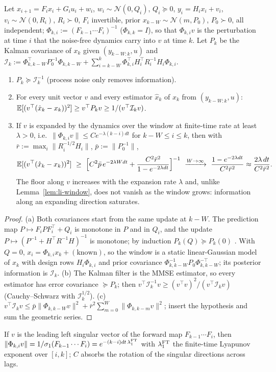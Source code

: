 \begin{lemma}\label{lem:li-expansion}
Let $x_{i+1}=F_ix_i+G_iu_i+w_i$, $w_i\sim\mathcal N(0,Q_i)$, $Q_i\succeq0$, $y_i=H_ix_i+v_i$, $v_i\sim\mathcal N(0,R_i)$,
$R_i\succ0$, $F_i$ invertible, prior $x_{k-W}\sim\mathcal N(m,P_0)$, $P_0\succ0$, all independent; $\Phi_{k,i}:=(F_{k-1}\cdots F_i)^{-1}$
($\Phi_{k,k}=I$), so that $\Phi_{k,i}v$ is the perturbation at time $i$ that the noise-free dynamics carry into $v$ at
time $k$. Let $P_k$ be the Kalman covariance of $x_k$ given $(y_{k-W:k},u)$ and
$\mathcal I_k:=\Phi_{k,k-W}^\top P_0^{-1}\Phi_{k,k-W}+\sum_{i=k-W}^{k}\Phi_{k,i}^\top H_i^\top R_i^{-1}H_i\Phi_{k,i}$.
\begin{enumerate}[leftmargin=2.2em]
\item[(a)] $P_k\succeq\mathcal I_k^{-1}$ (process noise only removes information).
\item[(b)] For every unit vector $v$ and every estimator $\hat x_k$ of $x_k$ from $(y_{k-W:k},u)$:
$\mathbb E[(v^\top(\hat x_k-x_k))^2]\ge v^\top P_kv\ge1/(v^\top\mathcal I_kv)$.
\item[(c)] If $v$ is expanded by the dynamics over the window at finite-time rate at least $\lambda>0$, i.e.\
$\|\Phi_{k,i}v\|\le C e^{-\lambda(k-i)dt}$ for $k-W\le i\le k$, then with $\bar r:=\max_i\|R_i^{-1/2}H_i\|$, $\bar p:=\|P_0^{-1}\|$,
\[
\E[(v^\top(\hat x_k-x_k))^2]\ \ge\ \Big[C^2\bar p\,e^{-2\lambda Wdt}+\frac{C^2\bar r^2}{1-e^{-2\lambda dt}}\Big]^{-1}
\ \xrightarrow{W\to\infty}\ \frac{1-e^{-2\lambda dt}}{C^2\bar r^2}\approx\frac{2\lambda\,dt}{C^2\bar r^2}.
\]
The floor along $v$ increases with the expansion rate $\lambda$ and, unlike Lemma~\ref{lem:li-window}, does not
vanish as the window grows: information along an expanding direction saturates.
\end{enumerate}
\end{lemma}
\begin{proof}
(a) Both covariances start from the same update at $k-W$. The prediction map $P\mapsto F_iPF_i^\top+Q_i$ is monotone in
$P$ and in $Q_i$, and the update $P\mapsto(P^{-1}+H^\top R^{-1}H)^{-1}$ is monotone; by induction $P_k(Q)\succeq P_k(0)$
\citep{andersonmoore1979}. With $Q=0$, $x_i=\Phi_{k,i}x_k+(\text{known})$, so the window is a static linear-Gaussian
model of $x_k$ with design rows $H_i\Phi_{k,i}$ and prior covariance $\Phi_{k,k-W}^{-1}P_0\Phi_{k,k-W}^{-\top}$; its
posterior information is $\mathcal I_k$. (b) The Kalman filter is the MMSE estimator, so every estimator has error
covariance $\succeq P_k$; then $v^\top\mathcal I_k^{-1}v\ge(v^\top v)^2/(v^\top\mathcal I_kv)$ (Cauchy--Schwarz with
$\mathcal I_k^{1/2}$). (c) $v^\top\mathcal I_kv\le\bar p\|\Phi_{k,k-W}v\|^2+\bar r^2\sum_{m=0}^W\|\Phi_{k,k-m}v\|^2$; insert the
hypothesis and sum the geometric series.
\end{proof}
\noindent If $v$ is the leading left singular vector of the forward map $F_{k-1}\cdots F_i$, then
$\|\Phi_{k,i}v\|=1/\sigma_1(F_{k-1}\cdots F_i)=e^{-(k-i)dt\,\lambda^{\rm FT}_1}$ with $\lambda^{\rm FT}_1$ the finite-time
Lyapunov exponent over $[i,k]$; $C$ absorbs the rotation of the singular directions across lags.

